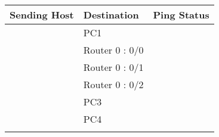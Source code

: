 \documentclass[a4paper,11pt]{article}
\begin{document}
\begin{enumerate}
\begin{table}[H]
              \begin{tabular}{| m{10em}| m{10em}| m{10em} |}
                  \hline
                  \multicolumn{1}{|l|}{\textbf{Sending Host}}                     & \textbf{Destination} & \multicolumn{1}{l|}{\textbf{Ping Status}}                                  \\
                  \hline
                  {\cellcolor[rgb]{0.141,0.525,1}}                                & PC1                  & {\cellcolor[rgb]{0.42,0.988,0.827}}                                        \\
                  \hhline{|>{\arrayrulecolor[rgb]{0.141,0.525,1}}->{\arrayrulecolor{black}}->{\arrayrulecolor[rgb]{0.42,0.988,0.827}}->{\arrayrulecolor{black}}|}
                  {\cellcolor[rgb]{0.141,0.525,1}}                                & Router 0 : 0/0       & {\cellcolor[rgb]{0.42,0.988,0.827}}                                        \\
                  \hhline{|>{\arrayrulecolor[rgb]{0.141,0.525,1}}->{\arrayrulecolor{black}}->{\arrayrulecolor[rgb]{0.42,0.988,0.827}}->{\arrayrulecolor{black}}|}
                  {\cellcolor[rgb]{0.141,0.525,1}}                                & Router 0 : 0/1       & {\cellcolor[rgb]{0.42,0.988,0.827}}                                        \\
                  \hhline{|>{\arrayrulecolor[rgb]{0.141,0.525,1}}->{\arrayrulecolor{black}}->{\arrayrulecolor[rgb]{0.42,0.988,0.827}}->{\arrayrulecolor{black}}|}
                  {\cellcolor[rgb]{0.141,0.525,1}}                                & Router 0 : 0/2       & {\cellcolor[rgb]{0.42,0.988,0.827}}                                        \\
                  \hhline{|>{\arrayrulecolor[rgb]{0.141,0.525,1}}->{\arrayrulecolor{black}}->{\arrayrulecolor[rgb]{0.42,0.988,0.827}}->{\arrayrulecolor{black}}|}
                  {\cellcolor[rgb]{0.141,0.525,1}}                                & PC3                  & {\cellcolor[rgb]{0.42,0.988,0.827}}                                        \\
                  \hhline{|>{\arrayrulecolor[rgb]{0.141,0.525,1}}->{\arrayrulecolor{black}}->{\arrayrulecolor[rgb]{0.42,0.988,0.827}}->{\arrayrulecolor{black}}|}
                  {\cellcolor[rgb]{0.141,0.525,1}}                                & PC4                  & {\cellcolor[rgb]{0.42,0.988,0.827}}                                        \\
                  \hhline{|>{\arrayrulecolor[rgb]{0.141,0.525,1}}->{\arrayrulecolor{black}}->{\arrayrulecolor[rgb]{0.42,0.988,0.827}}->{\arrayrulecolor{black}}|}

\end{tabular}
\end{table}
\end{enumerate}
\end{document}
